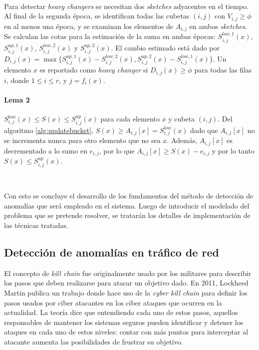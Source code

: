 \documentclass[a4paper,12pt, oneside]{article}
\begin{document}
\

Para detectar \textit{heavy changers} se necesitan dos \textit{sketches} adyacentes en el tiempo. Al final de la segunda época, se identifican todas las cubetas $(i,j)$ con $V_{i,j} \geq \phi$ en al menos una época, y se examinan los elementos de $A_{i,j}$ en ambos \textit{sketches}. Se calculan las cotas para la estimación de la suma en ambas épocas: $S_{i,j}^{low,1}(x)$, $S_{i,j}^{up,1}(x)$, $S_{i,j}^{low,2}(x)$ y $S_{i,j}^{up,2}(x)$. El cambio estimado está dado por $D_{i,j}(x) = \max\{S_{i,j}^{up,1}(x) - S_{i,j}^{low,2}(x), S_{i,j}^{up,2}(x) - S_{i,j}^{low,1}(x)\}$. Un elemento $x$ es reportado como \textit{heavy changer} si $D_{i,j}(x) \geq \phi$ para todas las filas $i$, donde $1 \leq i \leq r$, y $j = f_i(x)$.

\paragraph{Lema 2} $S_{i,j}^{low}(x) \leq S(x) \leq S_{i,j}^{up}(x)$ para cada elemento $x$ y cubeta $(i,j)$.
Del algoritmo \ref{alg:updatebucket}, $S(x) \geq A_{i,j}[x] = S_{i,j}^{low}(x)$ dado que $A_{i,j}[x]$ no se incrementa nunca para otro elemento que no sea $x$. Además, $A_{i,j}[x]$ es decrementado a lo sumo en $e_{i,j}$, por lo que $A_{i,j}[x] \geq S(x) - e_{i,j}$ y por lo tanto $S(x) \leq S_{i,j}^{up}(x)$.

\

Con esto se concluye el desarrollo de los fundamentos del método de detección de anomalías que será empleado en el sistema. Luego de introducir el modelado del problema que se pretende resolver, se tratarán los detalles de implementación de las técnicas tratadas.

\subsection{Detección de anomalías en tráfico de red}

El concepto de \textit{kill chain} fue originalmente usado por los militares para describir los pasos que deben realizarse para atacar un objetivo dado. En 2011, Lockheed Martin publica un trabajo donde hace uso de la \textit{cyber kill chain}\cite{hutchins2011intelligence} para definir los pasos usados por ciber atacantes en los ciber ataques que ocurren en la actualidad. La teoría dice que entendiendo cada uno de estos pasos, aquellos responsables de mantener los sistemas seguros pueden identificar y detener los ataques en cada uno de estos niveles: contar con más puntos para interceptar al atacante aumenta las posibilidades de frustrar su objetivo.
\end{document}
